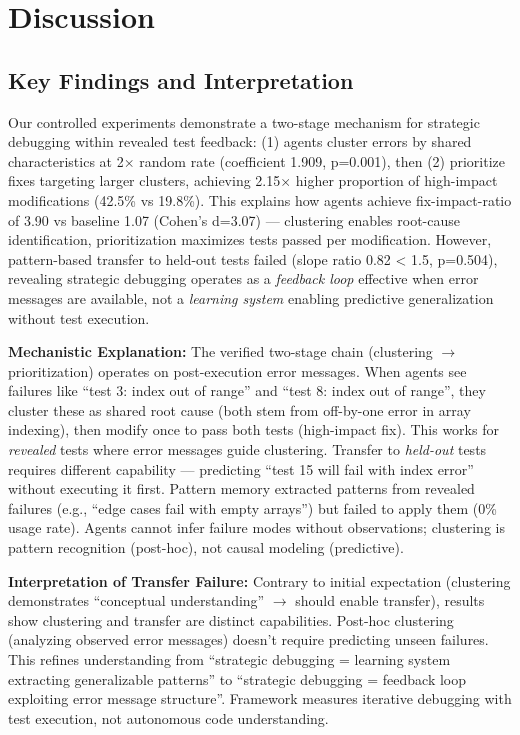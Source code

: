 \section{Discussion}

\subsection{Key Findings and Interpretation}

Our controlled experiments demonstrate a two-stage mechanism for strategic debugging within revealed test feedback: (1) agents cluster errors by shared characteristics at 2$\times$ random rate (coefficient 1.909, p=0.001), then (2) prioritize fixes targeting larger clusters, achieving 2.15$\times$ higher proportion of high-impact modifications (42.5\% vs 19.8\%). This explains how agents achieve fix-impact-ratio of 3.90 vs baseline 1.07 (Cohen's d=3.07) — clustering enables root-cause identification, prioritization maximizes tests passed per modification. However, pattern-based transfer to held-out tests failed (slope ratio 0.82 < 1.5, p=0.504), revealing strategic debugging operates as a \emph{feedback loop} effective when error messages are available, not a \emph{learning system} enabling predictive generalization without test execution.

\textbf{Mechanistic Explanation:} The verified two-stage chain (clustering $\rightarrow$ prioritization) operates on post-execution error messages. When agents see failures like ``test 3: index out of range'' and ``test 8: index out of range'', they cluster these as shared root cause (both stem from off-by-one error in array indexing), then modify once to pass both tests (high-impact fix). This works for \emph{revealed} tests where error messages guide clustering. Transfer to \emph{held-out} tests requires different capability — predicting ``test 15 will fail with index error'' without executing it first. Pattern memory extracted patterns from revealed failures (e.g., ``edge cases fail with empty arrays'') but failed to apply them (0\% usage rate). Agents cannot infer failure modes without observations; clustering is pattern recognition (post-hoc), not causal modeling (predictive).

\textbf{Interpretation of Transfer Failure:} Contrary to initial expectation (clustering demonstrates ``conceptual understanding'' $\rightarrow$ should enable transfer), results show clustering and transfer are distinct capabilities. Post-hoc clustering (analyzing observed error messages) doesn't require predicting unseen failures. This refines understanding from ``strategic debugging = learning system extracting generalizable patterns'' to ``strategic debugging = feedback loop exploiting error message structure''. Framework measures iterative debugging with test execution, not autonomous code understanding.

